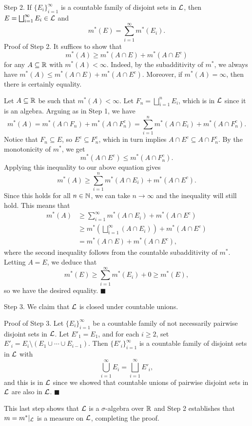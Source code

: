\begin{pf}
    {\sc Step 2.} If $\{E_i\}_{i=1}^\infty$ is a countable family of 
    disjoint sets in ${\cal L}$, then $E = \bigsqcup_{i=1}^\infty E_i \in 
    {\cal L}$ and 
    \[ m^*(E) = \sum_{i=1}^\infty m^*(E_i). \] 
    {\sc Proof of Step 2.} It suffices to show that 
    \[ m^*(A) \geq m^*(A \cap E) + m^*(A \cap E^c) \] 
    for any $A \subseteq \mathbb{R}$ with $m^*(A) < \infty$. Indeed, by the 
    subadditivity of $m^*$, we always have $m^*(A) \leq 
    m^*(A \cap E) + m^*(A \cap E^c)$. Moreover, if $m^*(A) = \infty$, 
    then there is certainly equality. 

    Let $A \subseteq \mathbb{R}$ be such that $m^*(A) < \infty$. Let 
    $F_n = \bigsqcup_{i=1}^n E_i$, which is in ${\cal L}$ since 
    it is an algebra. Arguing as in Step 1, we have 
    \[ m^*(A) = m^*(A \cap F_n) + m^*(A \cap F_n^c) 
    = \sum_{i=1}^n m^*(A \cap E_i) + m^*(A \cap F_n^c). \] 
    Notice that $F_n \subseteq E$, so $E^c \subseteq F_n^c$, which in 
    turn implies $A \cap E^c \subseteq A \cap F_n^c$. By the 
    monotonicity of $m^*$, we get 
    \[ m^*(A \cap E^c) \leq m^*(A \cap F_n^c). \] 
    Applying this inequality to our above equation gives 
    \[ m^*(A) \geq \sum_{i=1}^n m^*(A \cap E_i) + m^*(A \cap E^c). \] 
    Since this holds for all $n \in \mathbb{N}$, we can take $n \to \infty$ 
    and the inequality will still hold. This means that 
    \begin{align*}
        m^*(A) &\geq \sum_{i=1}^\infty m^*(A \cap E_i) + m^*(A \cap E^c) \\ 
        &\geq m^*\!\left( \bigsqcup_{i=1}^\infty (A \cap E_i) \right) 
        + m^*(A \cap E^c) \\ 
        &= m^*(A \cap E) + m^*(A \cap E^c), 
    \end{align*}
    where the second inequality follows from the countable subadditivity of 
    $m^*$. Letting $A = E$, we deduce that 
    \[ m^*(E) \geq \sum_{i=1}^\infty m^*(E_i) + 0 \geq m^*(E), \] 
    so we have the desired equality. \hfill $\blacksquare$ 

    {\sc Step 3.} We claim that ${\cal L}$ is closed under countable unions. 
    
    {\sc Proof of Step 3.} Let $\{E_i\}_{i=1}^\infty$ be a countable 
    family of not necessarily pairwise disjoint sets in ${\cal L}$. 
    Let $E'_1 = E_1$, and for each $i \geq 2$, set $E'_i = E_i \setminus 
    (E_1 \cup \cdots \cup E_{i-1})$. Then $\{E'_i\}_{i=1}^\infty$ is a 
    countable family of disjoint sets in ${\cal L}$ with 
    \[ \bigcup_{i=1}^\infty E_i = \bigsqcup_{i=1}^\infty E'_i, \] 
    and this is in ${\cal L}$ since we showed that countable unions of 
    pairwise disjoint sets in ${\cal L}$ are also in ${\cal L}$. 
    \hfill $\blacksquare$  

    This last step shows that ${\cal L}$ is a $\sigma$-algebra over $\mathbb{R}$
    and Step 2 establishes that $m = m^*|_{\cal L}$ is a measure on 
    ${\cal L}$, completing the proof. 
\end{pf}

